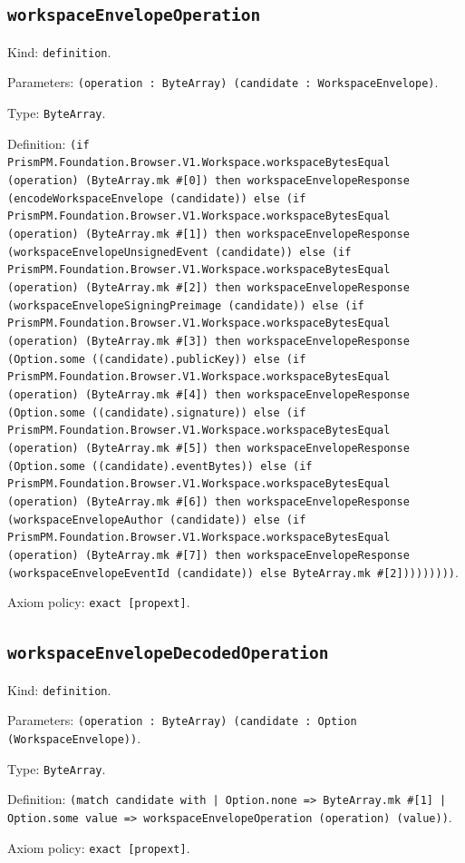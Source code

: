 \documentclass[11pt]{article}
\begin{document}
\subsection*{\texttt{workspaceEnvelopeOperation}}
\noindent Kind: \texttt{definition}.\par
\noindent Parameters: \texttt{(operation : ByteArray) (candidate : WorkspaceEnvelope)}.\par
\noindent Type: \texttt{ByteArray}.\par
\noindent Definition: \texttt{(if PrismPM.Foundation.Browser.V1.Workspace.workspaceBytesEqual (operation) (ByteArray.mk \#[0]) then workspaceEnvelopeResponse (encodeWorkspaceEnvelope (candidate)) else (if PrismPM.Foundation.Browser.V1.Workspace.workspaceBytesEqual (operation) (ByteArray.mk \#[1]) then workspaceEnvelopeResponse (workspaceEnvelopeUnsignedEvent (candidate)) else (if PrismPM.Foundation.Browser.V1.Workspace.workspaceBytesEqual (operation) (ByteArray.mk \#[2]) then workspaceEnvelopeResponse (workspaceEnvelopeSigningPreimage (candidate)) else (if PrismPM.Foundation.Browser.V1.Workspace.workspaceBytesEqual (operation) (ByteArray.mk \#[3]) then workspaceEnvelopeResponse (Option.some ((candidate).publicKey)) else (if PrismPM.Foundation.Browser.V1.Workspace.workspaceBytesEqual (operation) (ByteArray.mk \#[4]) then workspaceEnvelopeResponse (Option.some ((candidate).signature)) else (if PrismPM.Foundation.Browser.V1.Workspace.workspaceBytesEqual (operation) (ByteArray.mk \#[5]) then workspaceEnvelopeResponse (Option.some ((candidate).eventBytes)) else (if PrismPM.Foundation.Browser.V1.Workspace.workspaceBytesEqual (operation) (ByteArray.mk \#[6]) then workspaceEnvelopeResponse (workspaceEnvelopeAuthor (candidate)) else (if PrismPM.Foundation.Browser.V1.Workspace.workspaceBytesEqual (operation) (ByteArray.mk \#[7]) then workspaceEnvelopeResponse (workspaceEnvelopeEventId (candidate)) else ByteArray.mk \#[2]))))))))}.\par
\noindent Axiom policy: \texttt{exact [propext]}.\par
\subsection*{\texttt{workspaceEnvelopeDecodedOperation}}
\noindent Kind: \texttt{definition}.\par
\noindent Parameters: \texttt{(operation : ByteArray) (candidate : Option (WorkspaceEnvelope))}.\par
\noindent Type: \texttt{ByteArray}.\par
\noindent Definition: \texttt{(match candidate with | Option.none => ByteArray.mk \#[1] | Option.some value => workspaceEnvelopeOperation (operation) (value))}.\par
\noindent Axiom policy: \texttt{exact [propext]}.\par
\end{document}
